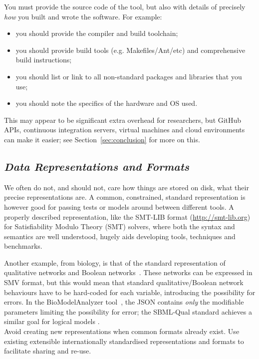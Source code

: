 \documentclass[a4paper,11pt]{article}
\begin{document}
 You must provide
the source code of the tool, but also with details of precisely
\emph{how} you built and wrote the software. For example:

\begin{itemize}
\item you should provide the compiler and build toolchain; 
\item you should provide build tools (e.g. Makefiles/Ant/etc) and
  comprehensive build instructions; 
\item you should list or link to all non-standard packages and libraries that you use; 
\item you should note the specifics of the hardware and OS used. 
\end{itemize}

This may appear to be significant extra overhead for researchers, but
GitHub APIs, continuous integration servers, virtual machines and
cloud environments can make it easier; see
Section~\ref{sec:conclusion} for more on this.


\subsection{{\emph{Data Representations and Formats}}}

We often do not, and should not, care how things are stored on disk,
what their precise representations are. A common, constrained,
standard representation is however good for passing tests or models around
between different tools. A properly described representation, like the
SMT-LIB format (\url{http://smt-lib.org}) for Satisfiability
Modulo Theory (SMT) solvers, where both the syntax and semantics are
well understood, hugely aids developing tools, techniques and
benchmarks.

Another example, from biology, is that of the standard representation
of qualitative networks and Boolean
networks~\cite{Kauffman1969,Schaub2007}.  These networks can be
expressed in SMV format, but this would mean that standard
qualitative/Boolean network behaviours have to be hard-coded for each
variable, introducing the possibility for errors. In the
BioModelAnalyzer tool~\cite{Benque2012}, the JSON contains \emph{only}
the modifiable parameters limiting the possibility for error; the 
SBML-Qual standard achieves a similar goal for logical models \cite{Chaouiya2013}.\\

 Avoid creating
new representations when common formats already exist. Use existing
extensible internationally standardised representations and formats to
facilitate sharing and re-use.
\end{document}
